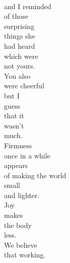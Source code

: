 \documentclass[smalldemyvopaper,11pt,twoside,onecolumn,openright,extrafontsizes]{memoir}
\begin{document}
\\and I reminded
\\of those
\\surprising
\\things she
\\had heard
\\which were
\\not yours.
\\You also
\\were cheerful
\\but I
\\guess
\\that it
\\wasn't
\\much.
\\Firmness
\\once in a while
\\appears
\\of making the world
\\small
\\and lighter.
\\Joy
\\makes
\\the body
\\less.
\\We believe
\\that working.
\end{document}
